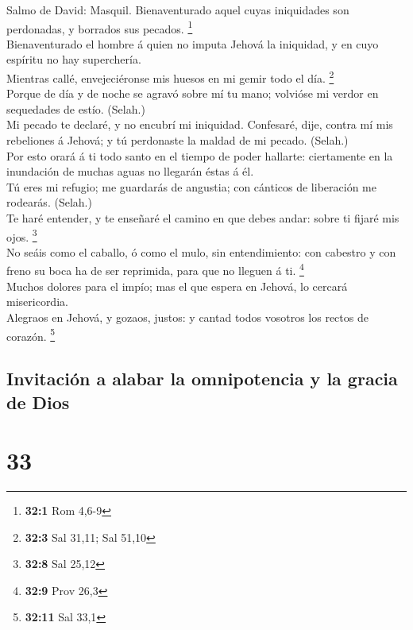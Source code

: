  Salmo de David: Masquil. Bienaventurado aquel cuyas
iniquidades son perdonadas, y borrados sus pecados. \footnote{\textbf{32:1}
  Rom 4,6-9}\\
 Bienaventurado el hombre á quien no imputa Jehová la
iniquidad, y en cuyo espíritu no hay superchería.\\
 Mientras callé, envejeciéronse mis huesos en mi gemir
todo el día. \footnote{\textbf{32:3} Sal 31,11; Sal 51,10}\\
 Porque de día y de noche se agravó sobre mí tu mano;
volvióse mi verdor en sequedades de estío. (Selah.)\\
 Mi pecado te declaré, y no encubrí mi iniquidad.
Confesaré, dije, contra mí mis rebeliones á Jehová; y tú perdonaste la
maldad de mi pecado. (Selah.)\\
 Por esto orará á ti todo santo en el tiempo de poder
hallarte: ciertamente en la inundación de muchas aguas no llegarán éstas
á él.\\
 Tú eres mi refugio; me guardarás de angustia; con
cánticos de liberación me rodearás. (Selah.)\\
 Te haré entender, y te enseñaré el camino en que debes
andar: sobre ti fijaré mis ojos. \footnote{\textbf{32:8} Sal 25,12}\\
 No seáis como el caballo, ó como el mulo, sin
entendimiento: con cabestro y con freno su boca ha de ser reprimida,
para que no lleguen á ti. \footnote{\textbf{32:9} Prov 26,3}\\
 Muchos dolores para el impío; mas el que espera en
Jehová, lo cercará misericordia.\\
 Alegraos en Jehová, y gozaos, justos: y cantad todos
vosotros los rectos de corazón. \footnote{\textbf{32:11} Sal 33,1}

\hypertarget{invitaciuxf3n-a-alabar-la-omnipotencia-y-la-gracia-de-dios}{%
\subsection{Invitación a alabar la omnipotencia y la gracia de
Dios}\label{invitaciuxf3n-a-alabar-la-omnipotencia-y-la-gracia-de-dios}}

\hypertarget{section-32}{%
\section{33}\label{section-32}}

